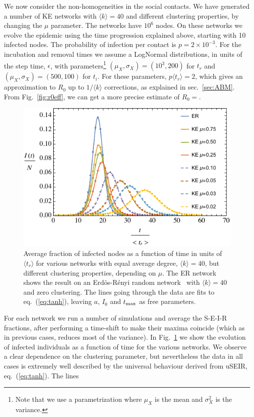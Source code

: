 \documentclass[10pt,letterpaper]{article}
\begin{document}
We now consider the non-homogeneities in the social contacts. 
We have generated a number of KE networks with $\langle k \rangle = 40$ and different clustering properties, by changing the $\mu$ parameter. The networks have $10^6$ nodes. On these networks we evolve the epidemic using the time progression explained above, starting with 10 infected nodes. The probability of infection per contact is $p=2 \times 10^{-3}$. For the incubation and removal times we assume a LogNormal distributions, in units of the step time, $\epsilon$,  with parameters\footnote{Note that we use a parametrization where $\mu_X$ is the mean and $\sigma^2_X$ is the variance.} $(\mu_X, \sigma_X)= (10^3, 200)$ for $t_r$ and $(\mu_X, \sigma_X)=(500, 100)$ for $t_i$. For these parameters, $p \langle t_r\rangle = 2$, which gives an approximation to $R_0$ up to $1/\langle k\rangle$ corrections, as explained in sec.~\ref{sec:ABM}. From Fig.~\ref{fig:r0eff}, we can get a more precise estimate of $R_0= $.
\begin{figure}[htbp]
\centering
 \includegraphics[width=1\linewidth]{KEfits.pdf}
\caption{Average fraction of infected nodes as a function of time in units of  $\langle t_r\rangle$ for various networks with equal average degree, $\langle k\rangle =40$, but different clustering properties, depending on $\mu$. The ER network shows the result on an Erd\"os-R\'enyi random
 network~\cite{ER:1959} with $\langle k\rangle=40$ and zero clustering.  The lines going through the data are fits  to eq.~(\ref{eq:tanh}), leaving $a$, $I_0$ and $t_{\rm max}$ as free parameters. }
\label{fig:net}
\end{figure}
For each network we run a number of simulations and average the S-E-I-R fractions, after performing a time-shift to make their maxima coincide (which as in previous cases, reduces most of the variance). In Fig.~\ref{fig:net} we show the evolution of infected individuals as a function of time for the various networks.  We observe a clear dependence on the clustering parameter, but nevertheless the data in all cases is extremely well described by  the universal behaviour  derived from uSEIR, eq.~(\ref{eq:tanh}). The lines
\end{document}

